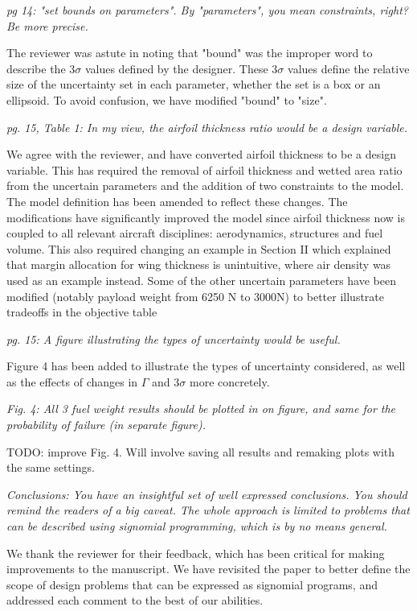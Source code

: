 \documentclass[11pt]{article}
\begin{document}
\textit{pg 14: "set bounds on parameters". By "parameters", you mean constraints, right? Be more precise.}

The reviewer was astute in noting that "bound" was the improper word to describe the $3\sigma$ values
defined by the designer. These $3\sigma$ values define the relative size
of the uncertainty set in each parameter, whether the set is a box or an ellipsoid.
To avoid confusion, we have modified "bound" to "size". 

\textit{pg. 15, Table 1: In my view, the airfoil thickness ratio would be a design variable.}

We agree with the reviewer, and have converted airfoil thickness to be a design variable. 
This has required the removal of airfoil thickness and wetted area ratio from the uncertain parameters
and the addition of two constraints to the model. The model definition has been
amended to reflect these changes. 
The modifications have significantly improved the model since 
airfoil thickness now is coupled to all relevant aircraft disciplines: aerodynamics, structures and 
fuel volume. This also required changing an example in Section II 
which explained that margin allocation for wing thickness 
is unintuitive, where air density was used as an example instead. 
Some of the other uncertain parameters have been modified (notably
payload weight from 6250 N to 3000N) to better illustrate tradeoffs in the objective 
table 

\textit{pg. 15: A figure illustrating the types of uncertainty would be useful.}

Figure 4 has been added to illustrate the types of uncertainty considered, 
as well as the effects of changes in $\Gamma$ and $3\sigma$ more concretely. 

\textit{Fig. 4: All 3 fuel weight results should be plotted in on figure, and same for the probability of failure (in separate figure).}

TODO: improve Fig. 4. Will involve saving all results and remaking plots with the same settings. 

\textit{Conclusions: You have an insightful set of well expressed conclusions. You should remind the readers of a big caveat. The whole approach is limited to problems that can be described using signomial programming, which is by no means general.}

We thank the reviewer for their feedback, which has been critical for making improvements to the manuscript. We 
have revisited the paper to better define the scope of design problems that can be expressed as signomial 
programs, and addressed each comment to the best of our abilities. 
\end{document}
